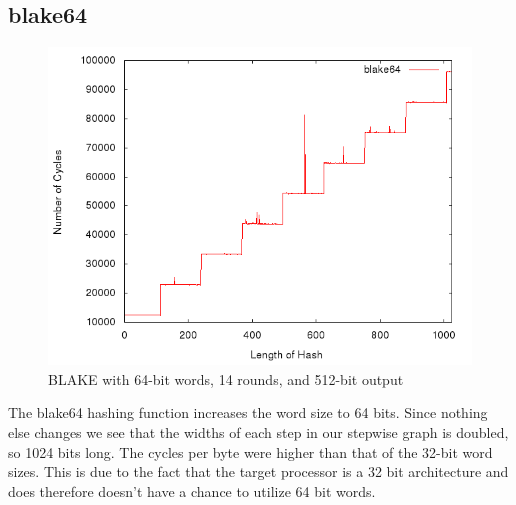 \documentclass[10pt,a4paper]{article}
\begin{document}
\subsection{blake64}
    \begin{figure}[H]
        \begin{center}
            \includegraphics[scale=0.5]{images/blake64.png} 
            \caption{BLAKE with 64-bit words, 14 rounds, and 512-bit output }
        \end{center}
    \end{figure}

The blake64 hashing function increases the word size to 64 bits. Since nothing else changes we see that the widths of each step in our 
stepwise graph is doubled, so 1024 bits long. The cycles per byte were higher than that of the 32-bit word sizes. This is due to the 
fact that the target processor is a 32 bit architecture and does therefore doesn't have a chance to utilize 64 bit words. 
\end{document}
